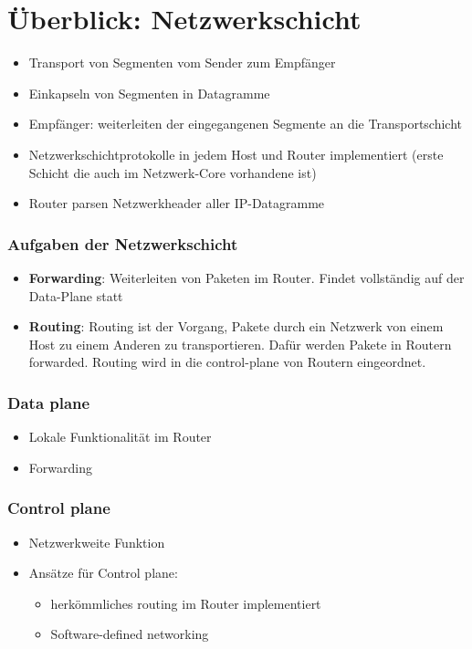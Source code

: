 
\section{Überblick: Netzwerkschicht}
\begin{itemize}
    \item Transport von Segmenten vom Sender zum Empfänger
    \item Einkapseln von Segmenten in Datagramme
    \item Empfänger: weiterleiten der eingegangenen Segmente an die Transportschicht
    \item Netzwerkschichtprotokolle in jedem Host und Router implementiert (erste Schicht die auch im Netzwerk-Core vorhandene ist)
    \item Router parsen Netzwerkheader aller IP-Datagramme
\end{itemize}

\subsubsection{Aufgaben der Netzwerkschicht}
\begin{itemize}
    \item \textbf{Forwarding}: Weiterleiten von Paketen im Router. Findet vollständig auf der Data-Plane statt
    \item \textbf{Routing}: Routing ist der Vorgang, Pakete durch ein Netzwerk von einem Host zu einem Anderen zu transportieren. Dafür werden Pakete in Routern forwarded.
    Routing wird in die control-plane von Routern eingeordnet.
\end{itemize}

\subsubsection{Data plane}
\begin{itemize}
    \item Lokale Funktionalität im Router
    \item Forwarding
\end{itemize}

\subsubsection{Control plane}
\begin{itemize}
    \item Netzwerkweite Funktion
    \item Ansätze für Control plane:
            \begin{itemize}
                \item herkömmliches routing im Router implementiert
                \item Software-defined networking
            \end{itemize}
\end{itemize}

